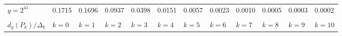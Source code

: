 \documentclass{article}
\theoremstyle{definition}
\begin{document}
\begin{table}[h!]
{\begin{tabular}{l | lllllllllll}
            \hline

            $y = 2^{41}$            & 0.1715                      & 0.1696                      & 0.0937                      & 0.0398                      & 0.0151                      & 0.0057                      & 0.0023                      & 0.0010                      & 0.0005                      & 0.0003                      & 0.0002                       \\
                                    & \multicolumn{1}{l}{}        & \multicolumn{1}{l}{}        & \multicolumn{1}{l}{}        & \multicolumn{1}{l}{}        & \multicolumn{1}{l}{}        & \multicolumn{1}{l}{}        & \multicolumn{1}{l}{}        & \multicolumn{1}{l}{}        & \multicolumn{1}{l}{}        & \multicolumn{1}{l}{}        & \multicolumn{1}{l}{}         \\
            $d_y(P_k) / \Delta_{k}$ & \multicolumn{1}{l}{$k = 0$} & \multicolumn{1}{l}{$k = 1$} & \multicolumn{1}{l}{$k = 2$} & \multicolumn{1}{l}{$k = 3$} & \multicolumn{1}{l}{$k = 4$} & \multicolumn{1}{l}{$k = 5$} & \multicolumn{1}{l}{$k = 6$} & \multicolumn{1}{l}{$k = 7$} & \multicolumn{1}{l}{$k = 8$} & \multicolumn{1}{l}{$k = 9$} & \multicolumn{1}{l}{$k = 10$} \\

            \hline


\end{tabular}}
\end{table}
\end{document}
